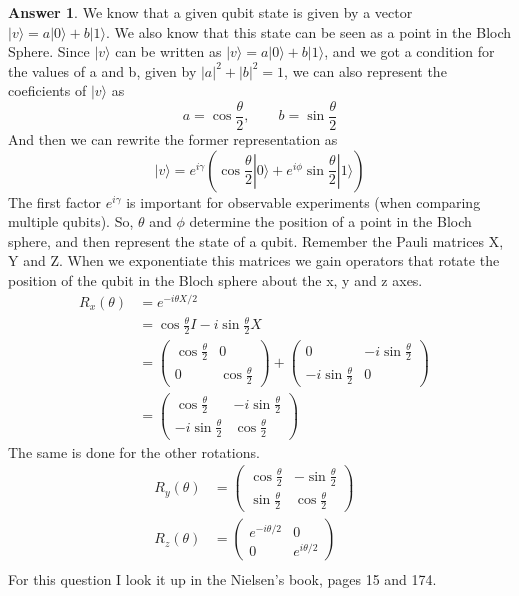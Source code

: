 \documentclass[12pt]{article}
\newcommand{\ket}[1]{|#1\rangle}
\theoremstyle{plain}
\theoremstyle{definition}
\newtheorem{ans}{Answer}
\begin{document}
\begin{ans}
	We know that a given qubit state is given by a vector $\ket{v} = a\ket{0} + b\ket{1}$.
	We also know that this state can be seen as a point in the Bloch Sphere.
	Since $\ket{v}$ can be written as $\ket{v} = a\ket{0} + b\ket{1}$, and we got a condition
	for the values of a and b, given by $\left\lvert a \right\rvert ^2 + \left\lvert b \right\rvert ^2 = 1$,
	we can also represent the coeficients of $\ket{v}$ as 
	\[ a = \cos{\frac{\theta}{2}}, \qquad b = \sin{\frac{\theta}{2}}\]
	And then we can rewrite the former representation as
	\[ \ket{v} = e^{i\gamma}(\cos{\frac{\theta}{2}}\ket{0} + e^{i\phi}\sin{\frac{\theta}{2}}\ket{1})\]
	The first factor $ e^{i\gamma}$ is important for observable experiments (when comparing multiple qubits).
	So, $\theta$ and $\phi$ determine the position of a point in the Bloch sphere, and then represent the state of a qubit.
	Remember the Pauli matrices X, Y and Z. When we exponentiate this matrices we gain 
	operators that rotate the position of the qubit in the Bloch sphere about the x, y and z axes.
	\begin{align*}
		R_x(\theta) &= e^{-i\theta X / 2} &\\
		&= \cos{\frac{\theta}{2}}I-i\sin{\frac{\theta}{2}}X&\\
		&= \begin{pmatrix}
			\cos{\frac{\theta}{2}} & 0 \\
			0 & \cos{\frac{\theta}{2}}
			\end{pmatrix} + \begin{pmatrix}
				0 & -i\sin{\frac{\theta}{2}} \\
				-i\sin{\frac{\theta}{2}} & 0
				\end{pmatrix}&\\
		&= \begin{pmatrix}
			\cos{\frac{\theta}{2}} & -i\sin{\frac{\theta}{2}} \\
			-i\sin{\frac{\theta}{2}} & \cos{\frac{\theta}{2}}
			\end{pmatrix}
	\end{align*}
	The same is done for the other rotations.
	\begin{align*}
		R_y(\theta) &= \begin{pmatrix}
			\cos{\frac{\theta}{2}} & -\sin{\frac{\theta}{2}} \\
			\sin{\frac{\theta}{2}} & \cos{\frac{\theta}{2}}
			\end{pmatrix}&\\
		R_z(\theta) &= \begin{pmatrix}
			e^{-i\theta/2} & 0 \\
			0 & e^{i\theta/2}
			\end{pmatrix}&\\
	\end{align*}
	For this question I look it up in the Nielsen's book, pages 15 and 174.
\end{ans}
\end{document}

